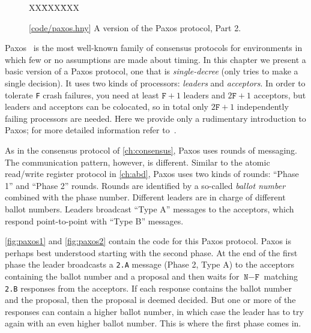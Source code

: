 \documentclass{report}
\newcommand{\harmonysource}[1]{
\begin{tabbing}
XX\=XXX\=XXX\kill
    
\end{tabbing}
}
\newcommand{\harmonylink}[1]{%
[\href{https://harmony.cs.cornell.edu/#1}{\underline{#1}}]%
}
\newenvironment{code}{
\tcolorbox
}{
\endtcolorbox
}
\begin{document}
\begin{figure}
\begin{code}
\harmonysource{paxos2}
\end{code}
\caption{\harmonylink{code/paxos.hny} A version of the Paxos protocol, Part 2.}
\label{fig:paxos2}
\end{figure}

Paxos~\cite{Paxos} is the most well-known family of consensus protocols for
environments in which few or no assumptions are made about timing.
In this chapter we present a basic version of a Paxos protocol, one that is
\emph{single-decree} (only tries to make a single decision).
It uses two kinds of processors: \emph{leaders} and \emph{acceptors}.
In order to tolerate \texttt{F} crash failures, you need at least $\texttt{F}+1$ leaders
and $2\texttt{F} + 1$ acceptors, but leaders and acceptors can be colocated, so
in total only $2\texttt{F} + 1$ independently failing processors are needed.
Here we provide only a rudimentary introduction to Paxos; for more detailed
information refer to~\cite{Paxos}.

As in the consensus protocol of \autoref{ch:consensus}, Paxos uses rounds of messaging.
The communication pattern, however, is different.
Similar to the atomic read/write register protocol in \autoref{ch:abd},
Paxos uses two kinds of rounds: ``Phase 1'' and ``Phase 2'' rounds.
Rounds are identified by a so-called
\emph{ballot number} combined with the phase number.
Different leaders are in charge of different ballot numbers.
Leaders broadcast ``Type A''
messages to the acceptors, which respond point-to-point with ``Type B''
messages.

\autoref{fig:paxos1} and \autoref{fig:paxos2} contain the code for
this Paxos protocol.  Paxos is perhaps best understood starting
with the second phase.  At the end of the first phase the leader
broadcasts a \texttt{2.A} message (Phase 2, Type A) to the acceptors
containing the ballot number and a proposal and then waits for
$\texttt{N} - \texttt{F}$ matching \texttt{2.B} responses from the
acceptors.  If each response contains the ballot number and the
proposal, then the proposal is deemed decided.  But one or more of
the responses can contain a higher ballot number, in which case the
leader has to try again with an even higher ballot number.  This is
where the first phase comes in.
\end{document}
